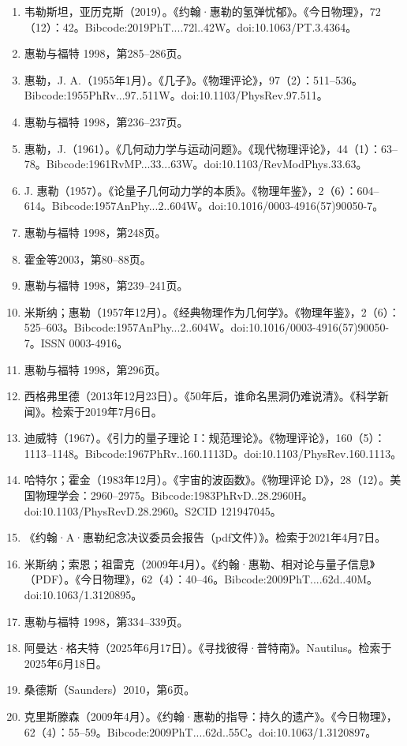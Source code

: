 \begin{enumerate}
\item 韦勒斯坦，亚历克斯（2019）。《约翰·惠勒的氢弹忧郁》。《今日物理》，72（12）：42。Bibcode:2019PhT....72l..42W。doi:10.1063/PT.3.4364。
\item 惠勒与福特 1998，第285–286页。
\item 惠勒，J. A.（1955年1月）。《几子》。《物理评论》，97（2）：511–536。Bibcode:1955PhRv...97..511W。doi:10.1103/PhysRev.97.511。
\item 惠勒与福特 1998，第236–237页。
\item 惠勒，J.（1961）。《几何动力学与运动问题》。《现代物理评论》，44（1）：63–78。Bibcode:1961RvMP...33...63W。doi:10.1103/RevModPhys.33.63。
\item J. 惠勒（1957）。《论量子几何动力学的本质》。《物理年鉴》，2（6）：604–614。Bibcode:1957AnPhy...2..604W。doi:10.1016/0003-4916(57)90050-7。
\item 惠勒与福特 1998，第248页。
\item 霍金等2003，第80–88页。
\item 惠勒与福特 1998，第239–241页。
\item 米斯纳；惠勒（1957年12月）。《经典物理作为几何学》。《物理年鉴》，2（6）：525–603。Bibcode:1957AnPhy...2..604W。doi:10.1016/0003-4916(57)90050-7。ISSN 0003-4916。
\item 惠勒与福特 1998，第296页。
\item 西格弗里德（2013年12月23日）。《50年后，谁命名黑洞仍难说清》。《科学新闻》。检索于2019年7月6日。
\item 迪威特（1967）。《引力的量子理论 I：规范理论》。《物理评论》，160（5）：1113–1148。Bibcode:1967PhRv..160.1113D。doi:10.1103/PhysRev.160.1113。
\item 哈特尔；霍金（1983年12月）。《宇宙的波函数》。《物理评论 D》，28（12）。美国物理学会：2960–2975。Bibcode:1983PhRvD..28.2960H。doi:10.1103/PhysRevD.28.2960。S2CID 121947045。
\item 《约翰·A·惠勒纪念决议委员会报告（pdf文件）》。检索于2021年4月7日。
\item 米斯纳；索恩；祖雷克（2009年4月）。《约翰·惠勒、相对论与量子信息》（PDF）。《今日物理》，62（4）：40–46。Bibcode:2009PhT....62d..40M。doi:10.1063/1.3120895。
\item 惠勒与福特 1998，第334–339页。
\item 阿曼达·格夫特（2025年6月17日）。《寻找彼得·普特南》。Nautilus。检索于2025年6月18日。
\item 桑德斯（Saunders）2010，第6页。
\item 克里斯滕森（2009年4月）。《约翰·惠勒的指导：持久的遗产》。《今日物理》，62（4）：55–59。Bibcode:2009PhT....62d..55C。doi:10.1063/1.3120897。

\end{enumerate}
